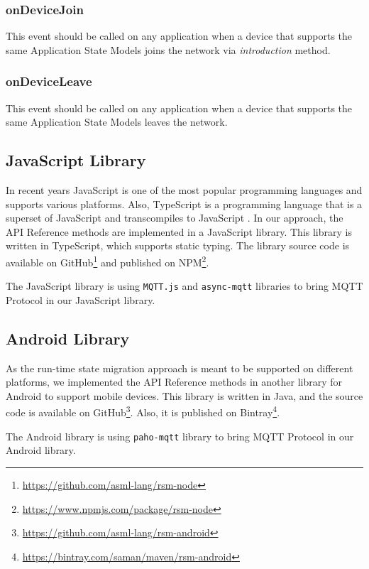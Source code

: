 \subsubsection{onDeviceJoin}
This event should be called on any application when a device that supports the same Application State Models joins the network via \textit{introduction} method.

\subsubsection{onDeviceLeave}
This event should be called on any application when a device that supports the same Application State Models leaves the network.


\subsection{JavaScript Library}
In recent years JavaScript is one of the most popular programming languages and supports various platforms. Also, TypeScript is a programming language that is a superset of JavaScript and transcompiles to JavaScript  \cite{typescript}. In our approach, the API Reference methods are implemented in a JavaScript library. This library is written in TypeScript, which supports static typing. The library source code is available on GitHub\footnote{\url{https://github.com/asml-lang/rsm-node}} and published on NPM\footnote{\url{https://www.npmjs.com/package/rsm-node}}.

The JavaScript library is using \lstinline[basicstyle=\ttfamily]{MQTT.js} and \lstinline[basicstyle=\ttfamily]{async-mqtt} libraries to bring MQTT Protocol in our JavaScript library.


\subsection{Android Library}
As the run-time state migration approach is meant to be supported on different platforms, we implemented the API Reference methods in another library for Android to support mobile devices. This library is written in Java, and
the source code is available on GitHub\footnote{\url{https://github.com/asml-lang/rsm-android}}. Also, it is published on Bintray\footnote{\url{https://bintray.com/saman/maven/rsm-android}}.

The Android library is using \lstinline[basicstyle=\ttfamily]{paho-mqtt} library to bring MQTT Protocol in our Android library.

